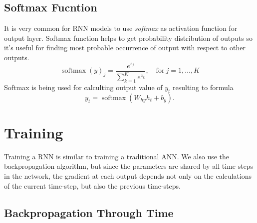 \subsection{Softmax Fucntion}
It is very common for RNN models to use \textit{softmax} as activation function for output layer.
Softmax function helps to get probability distribution of outputs so it's useful for finding most probable occurrence of output with respect to other outputs.
\[ \operatorname{softmax}(y)_j = \frac{e^{z_j}}{\sum_{k=1}^K e^{z_k}}, \quad \text{for} \ j = 1, \ldots,  K \]
Softmax is being used for calculting output value of $y_t$ resulting to formula
\[ y_t = \operatorname{softmax}(W_{hy}h_t + b_y). \]


\section{Training}

Training a RNN is similar to training a traditional ANN.
We also use the backpropagation algorithm, but since the parameters are shared by all time-steps in the network, the gradient at each output depends not only on the calculations of the current time-step, but also the previous time-steps\cite{rnn_train}.


\subsection{Backpropagation Through Time}

